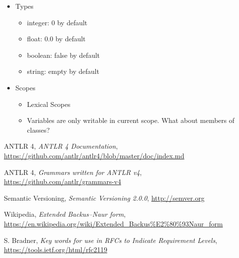 \documentclass[11pt,a4paper]{report}
\begin{document}
\begin{itemize}
    \item Types
    \begin{itemize}
        \item integer: 0 by default
        \item float: 0.0 by default
        \item boolean: false by default
        \item string: empty by default
    \end{itemize} 
    \item Scopes
    \begin{itemize}
        \item Lexical Scopes
        \item Variables are only writable in current scope. What about members of classes?
    \end{itemize}
\end{itemize}

\clearpage

\begin{thebibliography}{100}

    ANTLR 4,
    \textit{ANTLR 4 Documentation},
    \url{https://github.com/antlr/antlr4/blob/master/doc/index.md}

    ANTLR 4,
    \textit{Grammars written for ANTLR v4},
    \url{https://github.com/antlr/grammars-v4}

    Semantic Versioning,
    \textit{Semantic Versioning 2.0.0},
    \url{http://semver.org}

    Wikipedia,
    \textit{Extended Backus–Naur form},
    \url{https://en.wikipedia.org/wiki/Extended_Backus\%E2\%80\%93Naur_form}

    S. Bradner,
    \textit{Key words for use in RFCs to Indicate Requirement Levels},
    \url{https://tools.ietf.org/html/rfc2119}

\end{thebibliography}
\end{document}
